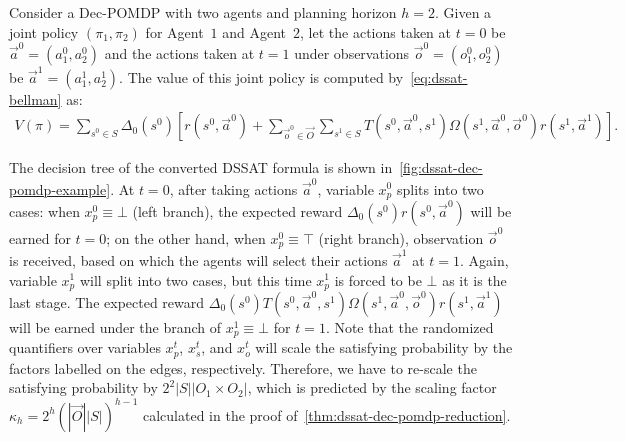 \begin{example}
    Consider a Dec-POMDP with two agents and planning horizon $h=2$.
    Given a joint policy $(\pi_1,\pi_2)$ for Agent~$1$ and Agent~$2$,
    let the actions taken at $t=0$ be $\vec{a}^0=(a_1^0,a_2^0)$ and
    the actions taken at $t=1$ under observations $\vec{o}^0=(o_1^0,o_2^0)$ be $\vec{a}^1=(a_1^1,a_2^1)$.
    The value of this joint policy is computed by~\cref{eq:dssat-bellman} as:
    \begin{align*}
        V(\pi)=
        \sum_{s^0\in S}\Delta_0(s^0)[r(s^0,\vec{a}^0)+
            \sum_{\vec{o}^0\in\vec{O}}\sum_{s^1\in S}T(s^0,\vec{a}^0,s^1)\Omega(s^1,\vec{a}^0,\vec{o}^0)r(s^1,\vec{a}^1)].
    \end{align*}

    The decision tree of the converted DSSAT formula is shown in~\cref{fig:dssat-dec-pomdp-example}.
    At $t=0$,
    after taking actions $\vec{a}^0$,
    variable $x_p^0$ splits into two cases:
    when $x_p^0\equiv\bot$ (left branch),
    the expected reward $\Delta_0(s^0)r(s^0,\vec{a}^0)$ will be earned for $t=0$;
    on the other hand,
    when $x_p^0\equiv\top$ (right branch),
    observation $\vec{o}^0$ is received,
    based on which the agents will select their actions $\vec{a}^1$ at $t=1$.
    Again, variable $x_p^1$ will split into two cases,
    but this time $x_p^1$ is forced to be $\bot$ as it is the last stage.
    The expected reward $\Delta_0(s^0)T(s^0,\vec{a}^0,s^1)\Omega(s^1,\vec{a}^0,\vec{o}^0)r(s^1,\vec{a}^1)$ will be earned under the branch of $x_p^1\equiv\bot$ for $t=1$.
    Note that the randomized quantifiers over variables $x_p^t$, $x_s^t$, and $x_o^t$ will scale the satisfying probability by the factors labelled on the edges, respectively.
    Therefore, we have to re-scale the satisfying probability by $2^2|S||O_1\times O_2|$,
    which is predicted by the scaling factor $\kappa_{h}=2^h(|\vec{O}||S|)^{h-1}$ calculated in the proof of~\cref{thm:dssat-dec-pomdp-reduction}.
\end{example}